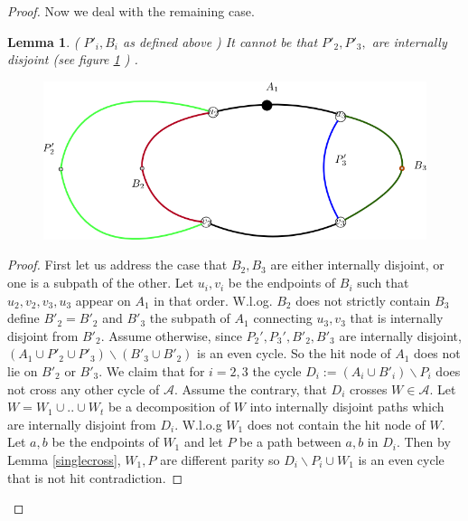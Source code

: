 \documentclass[letterpaper,11pt]{article}
\newtheorem{lemma}[theorem]{Lemma}
\newcommand{\0}{\mathbb{0}}
\newcommand{\1}{\mathbb{1}}
\begin{document}
\begin{proof}
Now we deal with the remaining case.
 \begin{lemma}\label{disjointP_i} 
 ( $P'_i, B_i $ as defined above ) It cannot be that  $P'_2, P'_3,  $ are internally disjoint (see figure \ref{disjointPi}   )%
 . 
\begin{figure}
        \includegraphics[scale=0.3]{DisjointP_i.png}
        \label{disjointPi}
   \end{figure}
 \end{lemma}
\begin{proof} 
First let us address the case that $B_2, B_3$ are either internally disjoint, or one is a subpath of the other. Let $u_i, v_i$ be the endpoints of $B_i$ such that $u_2, v_2, v_3, u_3$ appear on $A_1$ in that order. W.l.og.  $B_2$ does not strictly contain $B_3$ define $B'_2 =B'_2$ and $B'_3$ the subpath of $A_1$ connecting $u_3, v_3$ that is internally disjoint from $B'_2$.
Assume otherwise, since $P_2' , P_3' , B'_2 ,B'_3$ are internally disjoint,  $(A_1 \cup P'_2 \cup P'_3 ) \backslash (B'_3 \cup B'_2)$ is an even cycle. So the hit node of $A_1$ does not lie on $B'_2$ or $B'_3$.   %
We claim that for $i=2,3$ the cycle $ D_i:= (A_i \cup B'_i ) \backslash P_i$ does not cross any other cycle of $\mathcal{A}$.  Assume the contrary, that $D_i$ crosses $W \in \mathcal{A}$.  Let $W= W_1 \cup .. \cup W_t$ be a decomposition of $W$ into internally disjoint paths which are internally disjoint from $D_i$. W.l.o.g  $W_1$ does not contain  the hit node of $W$. Let $a,b$ be the endpoints of $W_1$ and let $P$ be a path between $a,b$ in $D_i$.  Then by Lemma \ref{singlecross}, $W_1 , P$ are different parity so $D_i \backslash P_i \cup W_1$ is an even cycle that is not hit contradiction.

\end{proof}
\end{proof}
\end{document}
